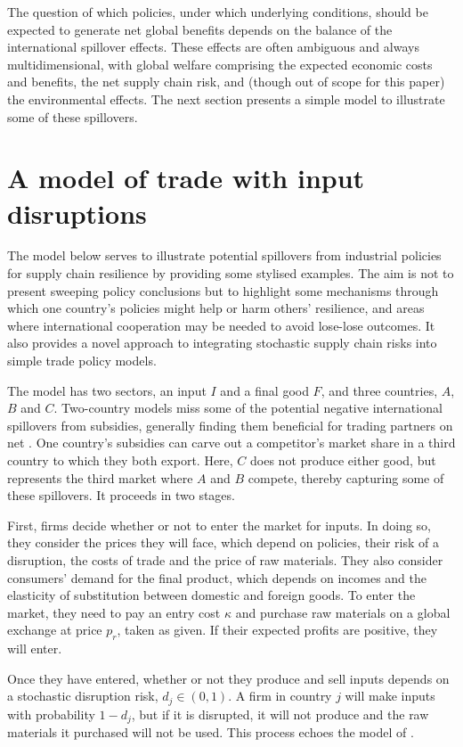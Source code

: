 \documentclass{article}
\begin{document}
The question of which policies, under which underlying conditions, should be expected to generate net global benefits depends on the balance of the international spillover effects. These effects are often ambiguous and always multidimensional, with global welfare comprising the expected economic costs and benefits, the net supply chain risk, and (though out of scope for this paper) the environmental effects. The next section presents a simple model to illustrate some of these spillovers.

\section{A model of trade with input disruptions}

The model below serves to illustrate potential spillovers from industrial policies for supply chain resilience by providing some stylised examples. The aim is not to present sweeping policy conclusions but to highlight some mechanisms through which one country's policies might help or harm others' resilience, and areas where international cooperation may be needed to avoid lose-lose outcomes. It also provides a novel approach to integrating stochastic supply chain risks into simple trade policy models.

The model has two sectors, an input $I$ and a final good $F$, and three countries, $A$, $B$ and $C$. Two-country models miss some of the potential negative international spillovers from subsidies, generally finding them beneficial for trading partners on net \parencite{bown_wtoing_2019}. One country's subsidies can carve out a competitor's market share in a third country to which they both export. Here, $C$ does not produce either good, but represents the third market where $A$ and $B$ compete, thereby capturing some of these spillovers. It proceeds in two stages.

First, firms decide whether or not to enter the market for inputs. In doing so, they consider the prices they will face, which depend on policies, their risk of a disruption, the costs of trade and the price of raw materials. They also consider consumers' demand for the final product, which depends on incomes and the elasticity of substitution between domestic and foreign goods. To enter the market, they need to pay an entry cost $\kappa$ and purchase raw materials on a global exchange at price $p_r$, taken as given. If their expected profits are positive, they will enter.

Once they have entered, whether or not they produce and sell inputs depends on a stochastic disruption risk, $d_j \in (0, 1)$. A firm in country $j$ will make inputs with probability $1 - d_j$, but if it is disrupted, it will not produce and the raw materials it purchased will not be used. This process echoes the model of \textcite{bimpikis_supply_2019}.
\end{document}
